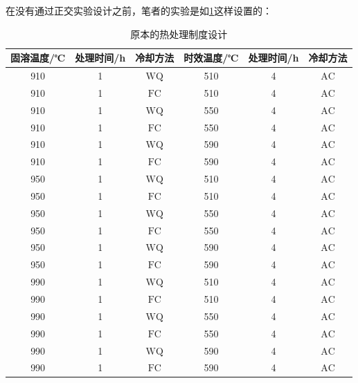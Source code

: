 在没有通过正交实验设计之前，笔者的实验是如\ref{sec:first}这样设置的：
\begin{table}[htbp]
	\centering
	\caption{\ti 原本的热处理制度设计}
	\label{sec:first}
	\begin{tabular}{cccccc}
		\toprule
		固溶温度/℃ &处理时间/h & 冷却方法 & 时效温度/℃  &处理时间/h & 冷却方法 \\
		\midrule
			910 & 1 & $\mathrm{WQ}$ & 510 & 4 & $\mathrm{AC}$\\
			910 & 1 & $\mathrm{FC}$  & 510 & 4 & $\mathrm{AC}$ \\
			910 & 1 & $\mathrm{WQ}$ & 550 & 4 & $\mathrm{AC}$ \\
			910 & 1 & $\mathrm{FC}$  & 550 & 4 & $\mathrm{AC}$ \\
			910 & 1 & $\mathrm{WQ}$ & 590 & 4 & $\mathrm{AC}$ \\
			910 & 1 & $\mathrm{FC}$  & 590 & 4 & $\mathrm{AC}$ \\
			\midrule
			950 & 1 & $\mathrm{WQ}$ & 510 & 4 & $\mathrm{AC}$ \\
			950 & 1 & $\mathrm{FC}$ & 510 & 4 & $\mathrm{AC}$ \\
			950 & 1 & $\mathrm{WQ}$ & 550 & 4 & $\mathrm{AC}$ \\
			950 & 1 & $\mathrm{FC}$ & 550 & 4 & $\mathrm{AC}$ \\
			950 & 1 & $\mathrm{WQ}$ & 590 & 4 & $\mathrm{AC}$ \\
			950 & 1 & $\mathrm{FC}$ & 590 & 4 & $\mathrm{AC}$ \\
			\midrule
			990 & 1 & $\mathrm{WQ}$ & 510 & 4 & $\mathrm{AC}$ \\
			990 & 1 & $\mathrm{FC}$ & 510 & 4 & $\mathrm{AC}$ \\
			990 & 1 & $\mathrm{WQ}$ & 550 & 4 & $\mathrm{AC}$ \\
			990 & 1 & $\mathrm{FC}$ & 550 & 4 & $\mathrm{AC}$ \\
			990 & 1 & $\mathrm{WQ}$ & 590 & 4 & $\mathrm{AC}$ \\
			990 & 1 & $\mathrm{FC}$ & 590 & 4 & $\mathrm{AC}$ \\
		\bottomrule
	\end{tabular}
\end{table}

